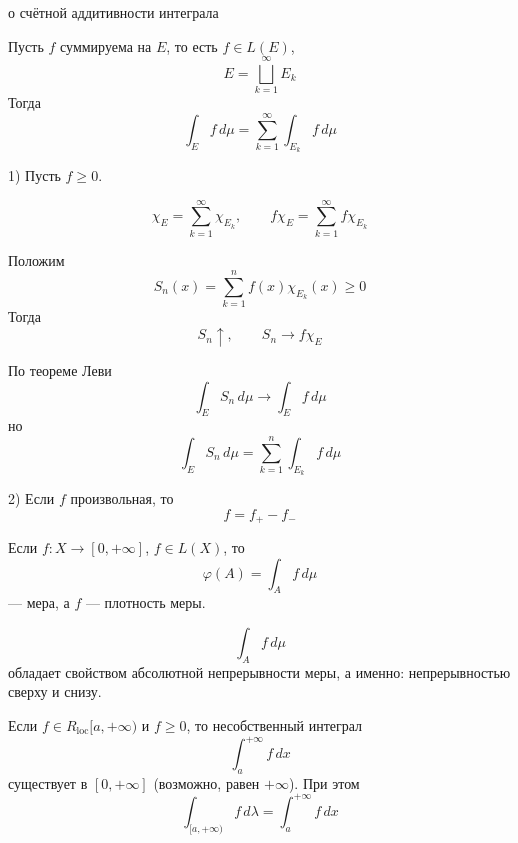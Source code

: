 \documentclass[12pt,a4paper]{article}
\begin{document}
\begin{theorem}{о счётной аддитивности интеграла}

    Пусть $f$ суммируема на $E$, то есть $f\in L(E)$,
    \[
        E=\bigsqcup_{k=1}^{\infty}E_k
    \]
    Тогда
    \[
        \int_E f\,d\mu
        =
        \sum_{k=1}^{\infty}\int_{E_k}f\,d\mu
    \]

\end{theorem}

\begin{proofbox}{}

    1) Пусть $f\geq 0$.

    \[
        \chi_E=\sum_{k=1}^{\infty}\chi_{E_k},
        \qquad
        f\chi_E=\sum_{k=1}^{\infty}f\chi_{E_k}
    \]

    Положим
    \[
        S_n(x)=\sum_{k=1}^{n}f(x)\chi_{E_k}(x)\geq 0
    \]
    Тогда
    \[
        S_n\uparrow,
        \qquad
        S_n\longrightarrow f\chi_E
    \]

    По теореме Леви
    \[
        \int_E S_n\,d\mu\longrightarrow\int_E f\,d\mu
    \]
    но
    \[
        \int_E S_n\,d\mu
        =
        \sum_{k=1}^{n}\int_{E_k}f\,d\mu
    \]

    2) Если $f$ произвольная, то
    \[
        f=f_+-f_-
    \]

\end{proofbox}

\begin{corollary}

    Если $f\colon X\to[0,+\infty]$, $f\in L(X)$, то
    \[
        \varphi(A)=\int_A f\,d\mu
    \]
    --- мера, а $f$ --- плотность меры.

\end{corollary}

\begin{corollary}

    \[
        \int_A f\,d\mu
    \]
    обладает свойством абсолютной непрерывности меры, а именно: непрерывностью сверху и снизу.

\end{corollary}

\begin{corollary}

    Если $f\in R_{\mathrm{loc}}[a,+\infty)$ и $f\geq0$, то несобственный интеграл
    \[
        \int_a^{+\infty}f\,dx
    \]
    существует в $[0,+\infty]$ (возможно, равен $+\infty$). При этом
    \[
        \int_{[a,+\infty)}f\,d\lambda
        =
        \int_a^{+\infty}f\,dx
    \]

\end{corollary}
\end{document}
